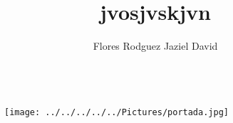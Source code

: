 \documentclass[11pt,a4paper]{article}
\author{Flores Rodguez Jaziel David }
\title{jvosjvskjvn}
\begin{document}
\begin{figure}[hbtp]
\centering
\\
\texttt{[image: ../../../../../Pictures/portada.jpg]} 
\end{figure} 
\end{document}
